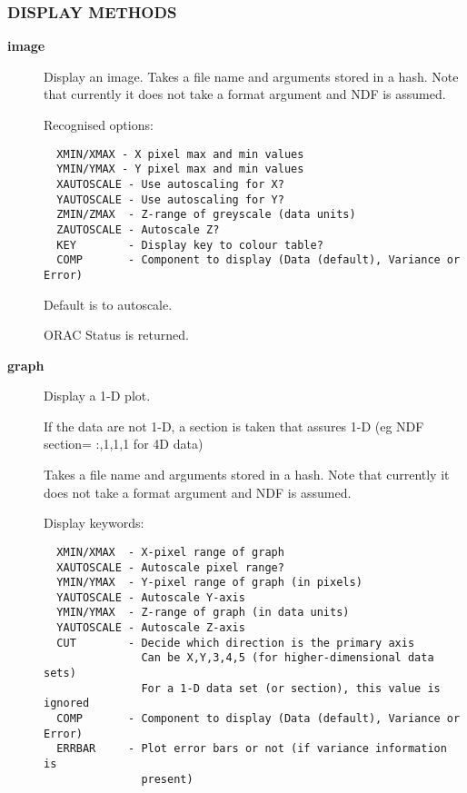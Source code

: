 \subsubsection*{DISPLAY METHODS\label{ORAC::Display::KAPVIEW_DISPLAY_METHODS}}
\begin{description}

\item[{\textbf{image}}] \mbox{}

Display an image.
Takes a file name and arguments stored in a hash.
Note that currently it does not take a format argument
and NDF is assumed.



Recognised options:

\begin{verbatim}
  XMIN/XMAX - X pixel max and min values
  YMIN/YMAX - Y pixel max and min values
  XAUTOSCALE - Use autoscaling for X?
  YAUTOSCALE - Use autoscaling for Y?
  ZMIN/ZMAX  - Z-range of greyscale (data units)
  ZAUTOSCALE - Autoscale Z?
  KEY        - Display key to colour table?
  COMP       - Component to display (Data (default), Variance or Error)
\end{verbatim}


Default is to autoscale.



ORAC Status is returned.


\item[{\textbf{graph}}] \mbox{}

Display a 1-D plot.



If the data are not 1-D, a section is taken that assures
1-D (eg NDF section= :,1,1,1 for 4D data)



Takes a file name and arguments stored in a hash.
Note that currently it does not take a format argument
and NDF is assumed.



Display keywords:

\begin{verbatim}
  XMIN/XMAX  - X-pixel range of graph
  XAUTOSCALE - Autoscale pixel range?
  YMIN/YMAX  - Y-pixel range of graph (in pixels)
  YAUTOSCALE - Autoscale Y-axis
  YMIN/YMAX  - Z-range of graph (in data units)
  YAUTOSCALE - Autoscale Z-axis
  CUT        - Decide which direction is the primary axis
               Can be X,Y,3,4,5 (for higher-dimensional data sets)
               For a 1-D data set (or section), this value is ignored
  COMP       - Component to display (Data (default), Variance or Error)
  ERRBAR     - Plot error bars or not (if variance information is
               present)
\end{verbatim}



\end{description}
